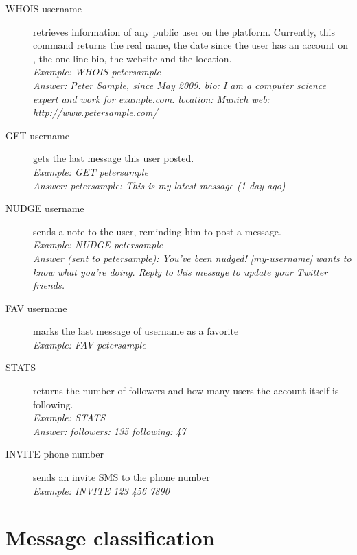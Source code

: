\begin{description}
\begin{description}
    \item[WHOIS username]
      retrieves information of any public user on the \Twitter{} platform.
      Currently, this command returns the real name, the date since the user
      has an account on \Twitter{}, the one line bio, the website and the
      location.\\
      \textit{Example: WHOIS petersample}\\
      \textit{Answer: Peter Sample, since May 2009. bio: I am a computer
              science expert and work for example.com. location: Munich web:
              \url{http://www.petersample.com/}}

    \item[GET username]
      gets the last message this user posted.\\
      \textit{Example: GET petersample}\\
      \textit{Answer: petersample: This is my latest message (1 day ago)}

    \item[NUDGE username]
      sends a note to the user, reminding him to post a message.\\
      \textit{Example: NUDGE petersample}\\
      \textit{Answer (sent to petersample): You've been nudged! [my-username] wants to know what you're doing. Reply to this
      message to update your Twitter friends.}

    \item[FAV username]
      marks the last message of username as a favorite\\
      \textit{Example: FAV petersample}

    \item[STATS]
      returns the number of followers and how many users the account itself is
      following.\\
      \textit{Example: STATS}\\
      \textit{Answer: followers: 135 following: 47}

    \item[INVITE phone number]
      sends an invite SMS to the phone number\\
      \textit{Example: INVITE 123 456 7890}

\end{description}
\end{description}



\section{Message classification}

